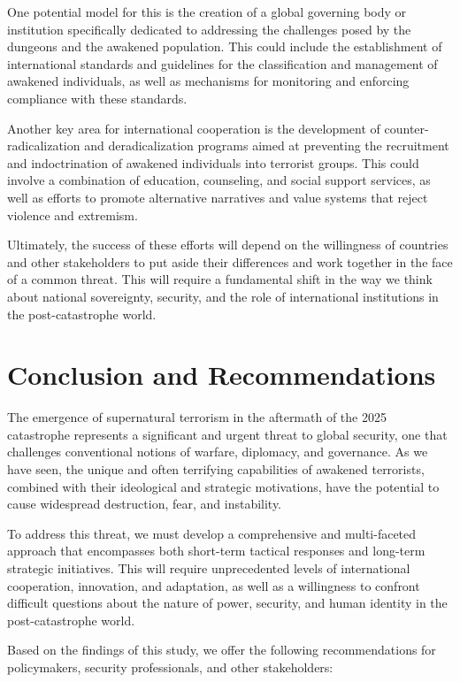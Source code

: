 \documentclass[12pt, a4paper]{article}
\begin{document}
One potential model for this is the creation of a global governing body or institution specifically dedicated to addressing the challenges posed by the dungeons and the awakened population. This could include the establishment of international standards and guidelines for the classification and management of awakened individuals, as well as mechanisms for monitoring and enforcing compliance with these standards.

Another key area for international cooperation is the development of counter-radicalization and deradicalization programs aimed at preventing the recruitment and indoctrination of awakened individuals into terrorist groups. This could involve a combination of education, counseling, and social support services, as well as efforts to promote alternative narratives and value systems that reject violence and extremism.

Ultimately, the success of these efforts will depend on the willingness of countries and other stakeholders to put aside their differences and work together in the face of a common threat. This will require a fundamental shift in the way we think about national sovereignty, security, and the role of international institutions in the post-catastrophe world.

\section{Conclusion and Recommendations}
The emergence of supernatural terrorism in the aftermath of the 2025 catastrophe represents a significant and urgent threat to global security, one that challenges conventional notions of warfare, diplomacy, and governance. As we have seen, the unique and often terrifying capabilities of awakened terrorists, combined with their ideological and strategic motivations, have the potential to cause widespread destruction, fear, and instability.

To address this threat, we must develop a comprehensive and multi-faceted approach that encompasses both short-term tactical responses and long-term strategic initiatives. This will require unprecedented levels of international cooperation, innovation, and adaptation, as well as a willingness to confront difficult questions about the nature of power, security, and human identity in the post-catastrophe world.

Based on the findings of this study, we offer the following recommendations for policymakers, security professionals, and other stakeholders:
\end{document}
